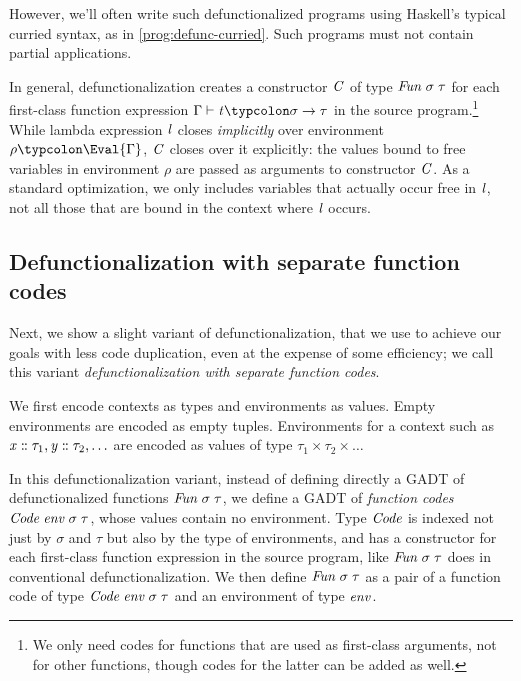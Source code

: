 However, we'll often write such defunctionalized programs using Haskell's
typical curried syntax, as in \cref{prog:defunc-curried}. Such programs must not
contain partial applications.

In general, defunctionalization creates a constructor \ensuremath{\Conid{C}} of type \ensuremath{\Conid{Fun}\;\sigma\;\tau} for each first-class function expression \ensuremath{\Gamma\vdash\Varid{t}\typcolon\sigma\to \tau} in the
source program.\footnote{We only need codes for functions that are used as
  first-class arguments, not for other functions, though codes for the latter
  can be added as well.}
%
While lambda expression \ensuremath{\Varid{l}} closes \emph{implicitly} over environment \ensuremath{\rho\typcolon\Eval{\Gamma}}, \ensuremath{\Conid{C}} closes over it explicitly: the values bound to free variables
in environment \ensuremath{\rho} are passed as arguments to constructor \ensuremath{\Conid{C}}. As a standard
optimization, we only includes variables that actually occur free in \ensuremath{\Varid{l}}, not
all those that are bound in the context where \ensuremath{\Varid{l}} occurs.

\subsection{Defunctionalization with separate function codes}
Next, we show a slight variant of defunctionalization, that we use to achieve
our goals with less code duplication, even at the expense of some efficiency; we
call this variant \emph{defunctionalization with separate function codes}.

We first encode contexts as types and environments as values. Empty environments
are encoded as empty tuples. Environments for a context such as \ensuremath{\Varid{x}\mathrel{:\mkern-1mu:}\tau_{1},\Varid{y}\mathrel{:\mkern-1mu:}\tau_{2},\ldots} are encoded as values of type \ensuremath{\tau_{1}\times\tau_{2}\times\ldots}

In this defunctionalization variant, instead of defining directly a GADT of
defunctionalized functions \ensuremath{\Conid{Fun}\;\sigma\;\tau}, we define a GADT of \emph{function
  codes} \ensuremath{\Conid{Code}\;\Varid{env}\;\sigma\;\tau}, whose values contain no environment. Type \ensuremath{\Conid{Code}}
is indexed not just by \ensuremath{\sigma} and \ensuremath{\tau} but also by the type of environments,
and has a constructor for each first-class function expression in the source
program, like \ensuremath{\Conid{Fun}\;\sigma\;\tau} does in conventional defunctionalization. We then
define \ensuremath{\Conid{Fun}\;\sigma\;\tau} as a pair of a function code of type \ensuremath{\Conid{Code}\;\Varid{env}\;\sigma\;\tau}
and an environment of type \ensuremath{\Varid{env}}.

